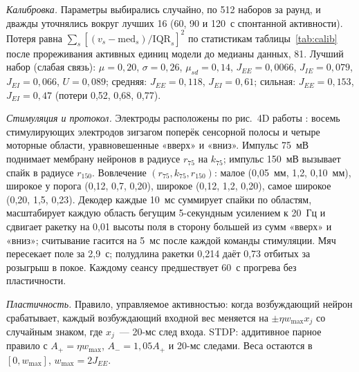 \documentclass[pre,twocolumn,superscriptaddress,showpacs=false,amsmath,amssymb,nofootinbib]{revtex4-2}
\begin{document}
\emph{Калибровка.} Параметры выбирались случайно, по 512 наборов за раунд, и дважды уточнялись вокруг лучших 16 (60, 90 и 120~с спонтанной активности). Потеря равна $\sum_s[(v_s-\mathrm{med}_s)/\mathrm{IQR}_s]^2$ по статистикам таблицы~\ref{tab:calib} после прореживания активных единиц модели до медианы данных, 81. Лучший набор (слабая связь): $\mu=0{,}20$, $\sigma=0{,}26$, $\mu_{sd}=0{,}14$, $J_{EE}=0{,}0066$, $J_{IE}=0{,}079$, $J_{EI}=0{,}066$, $U=0{,}089$; средняя: $J_{EE}=0{,}118$, $J_{EI}=0{,}61$; сильная: $J_{EE}=0{,}153$, $J_{EI}=0{,}47$ (потери 0{,}52, 0{,}68, 0{,}77).

\emph{Стимуляция и протокол.} Электроды расположены по рис.~4D работы \cite{Kagan2022}: восемь стимулирующих электродов зигзагом поперёк сенсорной полосы и четыре моторные области, уравновешенные «вверх» и «вниз». Импульс 75~мВ поднимает мембрану нейронов в радиусе $r_{75}$ на $k_{75}$; импульс 150~мВ вызывает спайк в радиусе $r_{150}$. Вовлечение $(r_{75},k_{75},r_{150})$: малое (0{,}05~мм, 1{,}2, 0{,}10~мм), широкое у порога (0{,}12, 0{,}7, 0{,}20), широкое (0{,}12, 1{,}2, 0{,}20), самое широкое (0{,}20, 1{,}5, 0{,}23). Декодер каждые 10~мс суммирует спайки по областям, масштабирует каждую область бегущим 5-секундным усилением к 20~Гц и сдвигает ракетку на 0{,}01 высоты поля в сторону большей из сумм «вверх» и «вниз»; считывание гасится на 5~мс после каждой команды стимуляции. Мяч пересекает поле за 2{,}9~с; полудлина ракетки 0{,}214 даёт 0{,}73 отбитых за розыгрыш в покое. Каждому сеансу предшествует 60~с прогрева без пластичности.

\emph{Пластичность.} Правило, управляемое активностью: когда возбуждающий нейрон срабатывает, каждый возбуждающий входной вес меняется на $\pm\eta w_{\max}x_j$ со случайным знаком, где $x_j$~--- 20-мс след входа. STDP: аддитивное парное правило с $A_+=\eta w_{\max}$, $A_-=1{,}05A_+$ и 20-мс следами. Веса остаются в $[0,w_{\max}]$, $w_{\max}=2J_{EE}$.
\end{document}
